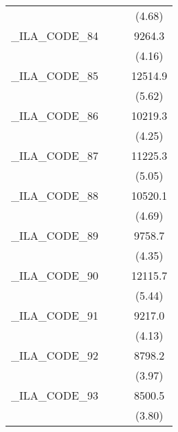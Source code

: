 {\begin{tabular}{l*{3}{c}}
            &                     &                     &      (4.68)         \\
[1em]
\_ILA\_CODE\_84&                     &                     &      9264.3\sym{***}\\
            &                     &                     &      (4.16)         \\
[1em]
\_ILA\_CODE\_85&                     &                     &     12514.9\sym{***}\\
            &                     &                     &      (5.62)         \\
[1em]
\_ILA\_CODE\_86&                     &                     &     10219.3\sym{***}\\
            &                     &                     &      (4.25)         \\
[1em]
\_ILA\_CODE\_87&                     &                     &     11225.3\sym{***}\\
            &                     &                     &      (5.05)         \\
[1em]
\_ILA\_CODE\_88&                     &                     &     10520.1\sym{***}\\
            &                     &                     &      (4.69)         \\
[1em]
\_ILA\_CODE\_89&                     &                     &      9758.7\sym{***}\\
            &                     &                     &      (4.35)         \\
[1em]
\_ILA\_CODE\_90&                     &                     &     12115.7\sym{***}\\
            &                     &                     &      (5.44)         \\
[1em]
\_ILA\_CODE\_91&                     &                     &      9217.0\sym{***}\\
            &                     &                     &      (4.13)         \\
[1em]
\_ILA\_CODE\_92&                     &                     &      8798.2\sym{***}\\
            &                     &                     &      (3.97)         \\
[1em]
\_ILA\_CODE\_93&                     &                     &      8500.5\sym{***}\\
            &                     &                     &      (3.80)         \\

\end{tabular}}
